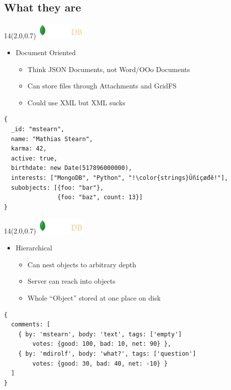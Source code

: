 \documentclass{beamer}
\newcommand{\MongoLogo}{
\begin{textblock}{14}(2.0,0.7)
  \includegraphics[height=0.8cm]{logo-mongodb-ondark.png}
\end{textblock}
}
\begin{document}
\subsection{What they are}
\begin{frame}[fragile]
  \MongoLogo
  \begin{itemize}
    \item Document Oriented
    \begin{itemize}
      \item Think JSON Documents, not Word/OOo Documents
      \item Can store files through Attachments and GridFS
      \item Could use XML but XML sucks
    \end{itemize}
  \end{itemize}

  \begin{lstlisting}
{
  _id: "mstearn",
  name: "Mathias Stearn",
  karma: 42,
  active: true,
  birthdate: new Date(517896000000),
  interests: ["MongoDB", "Python", "!\color{strings}Üñíçøđĕ!"],
  subobjects: [{foo: "bar"},
               {foo: "baz", count: 13}]
}
  \end{lstlisting}
\end{frame}

\begin{frame}[fragile]
  \MongoLogo
  \begin{itemize}
    \item Hierarchical 
    \begin{itemize}
      \item Can nest objects to arbitrary depth
      \item Server can reach into objects
      \item Whole ``Object'' stored at one place on disk
    \end{itemize}
  \end{itemize}

  \small
  \begin{lstlisting}
{
  comments: [
    { by: 'mstearn', body: 'text', tags: ['empty']
        votes: {good: 100, bad: 10, net: 90} },
    { by: 'mdirolf', body: 'what?', tags: ['question']
        votes: {good: 30, bad: 40, net: -10} }
  ]
}
  \end{lstlisting}
\end{frame}
\end{document}
